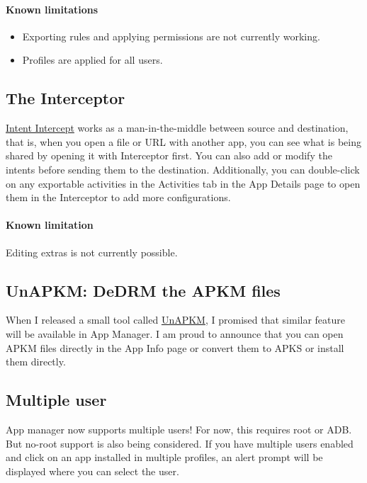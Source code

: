 \paragraph{Known limitations}
\begin{itemize}
    \item Exporting rules and applying permissions are not currently working.
    \item Profiles are applied for all users.
\end{itemize}

\subsection{The Interceptor}\label{subsec:the-interceptor}
\href{https://github.com/MuntashirAkon/intent-intercept}{Intent Intercept} works as a man-in-the-middle between source
and destination, that is, when you open a file or URL with another app, you can see what is being shared by opening it
with Interceptor first. You can also add or modify the intents before sending them to the destination. Additionally,
you can double-click on any exportable activities in the Activities tab in the App Details page to open them in the
Interceptor to add more configurations.

\paragraph{Known limitation} Editing extras is not currently possible.

\subsection{UnAPKM: DeDRM the APKM files}\label{subsec:unapkm:-dedrm-the-apkm-files}
When I released a small tool called \href{https://f-droid.org/en/packages/io.github.muntashirakon.unapkm}{UnAPKM},
I promised that similar feature will be available in App Manager. I am proud to announce that you can open APKM files
directly in the App Info page or convert them to APKS or install them directly.

\subsection{Multiple user}\label{subsec:multiple-user}
App manager now supports multiple users! For now, this requires root or ADB. But no-root support is also being
considered. If you have multiple users enabled and click on an app installed in multiple profiles, an alert prompt will
be displayed where you can select the user.

